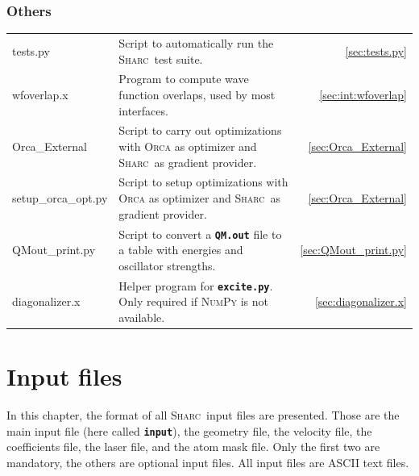 \documentclass[a4paper,10pt,DIV=15,openany,twoside=false]{scrbook}
\newcommand{\sharc}{\textsc{Sharc}}
\newcommand{\ttt}[1]{\textbf{\texttt{#1}}}
\begin{document}
\subsection{Others}

\begin{tabular}{>{\ttfamily}lp{10.5cm}r}
  tests.py              &Script to automatically run the \sharc\ test suite.                                                    &\ref{sec:tests.py}\\
  wfoverlap.x           &Program to compute wave function overlaps, used by most interfaces.                                    &\ref{sec:int:wfoverlap}\\
  Orca\_External        &Script to carry out optimizations with \textsc{Orca} as optimizer and \sharc\ as gradient provider.    &\ref{sec:Orca_External}\\
  setup\_orca\_opt.py   &Script to setup optimizations with \textsc{Orca} as optimizer and \sharc\ as gradient provider.        &\ref{sec:Orca_External}\\
  QMout\_print.py       &Script to convert a \ttt{QM.out} file to a table with energies and oscillator strengths.               &\ref{sec:QMout_print.py}\\
  diagonalizer.x        &Helper program for \ttt{excite.py}. Only required if \textsc{NumPy} is not available.                  &\ref{sec:diagonalizer.x}\\
\end{tabular}


\chapter{Input files}\label{chap:input}

In this chapter, the format of all \sharc\ input files are presented. Those are the main input file (here called \ttt{input}), the geometry file, the velocity file, the coefficients file, the laser file, and the atom mask file. Only the first two are mandatory, the others are optional input files. All input files are ASCII text files.

\end{document}
